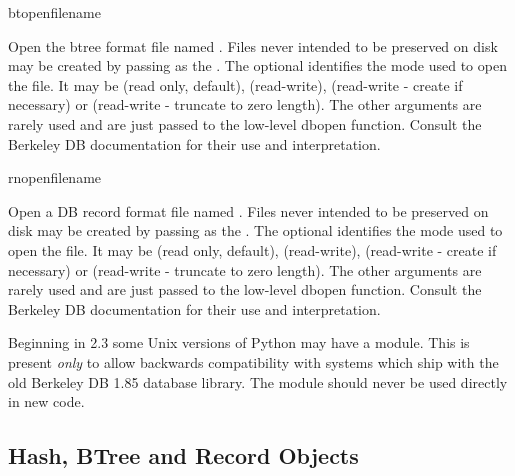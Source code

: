 \begin{funcdesc}{btopen}{filename}

Open the btree format file named .  Files never intended 
to be preserved on disk may be created by passing  as the 
.  The optional
 identifies the mode used to open the file.  It may be
 (read only, default),  (read-write),
 (read-write - create if necessary) or
 (read-write - truncate to zero length).  The other
arguments are rarely used and are just passed to the low-level dbopen
function.  Consult the Berkeley DB documentation for their use and
interpretation.
\end{funcdesc}

\begin{funcdesc}{rnopen}{filename}

Open a DB record format file named .  Files never intended 
to be preserved on disk may be created by passing  as the 
.  The optional
 identifies the mode used to open the file.  It may be
 (read only, default),  (read-write),
 (read-write - create if necessary) or
 (read-write - truncate to zero length).  The other
arguments are rarely used and are just passed to the low-level dbopen
function.  Consult the Berkeley DB documentation for their use and
interpretation.
\end{funcdesc}


\begin{seealso}
\end{seealso}

\begin{notice}
Beginning in 2.3 some Unix versions of Python may have a 
module.  This is present \emph{only} to allow backwards compatibility with
systems which ship with the old Berkeley DB 1.85 database library.  The
 module should never be used directly in new code.
\end{notice}

\subsection{Hash, BTree and Record Objects \label{bsddb-objects}}

